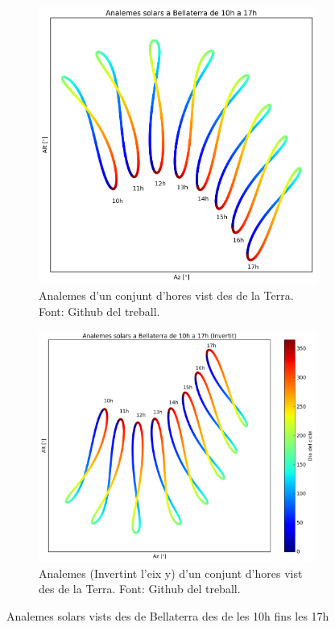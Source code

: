 \documentclass[a4paper, 11pt]{article}
\begin{document}
\begin{figure}[h!]
    \centering
    \begin{subfigure}{0.42\textwidth}
        \centering
        \includegraphics[width=\textwidth]{images/analema_simUAB.png}
        \caption{Analemes d'un conjunt d'hores vist des de la Terra. Font: Github del treball.}
        \label{subfig:analema_simUAB}
    \end{subfigure}
    \hspace{0.05\textwidth}
    \begin{subfigure}{0.48\textwidth}
        \centering
        \includegraphics[width=\textwidth]{images/analema_simUAB_invert.png}
        \caption{Analemes (Invertint l'eix y) d'un conjunt d'hores vist des de la Terra. Font: Github del treball.}
        \label{subfig:analema_simUAB_invert}
    \end{subfigure}
\caption{Analemes solars vists des de Bellaterra des de les 10h fins les 17h}
\end{figure}
\vspace{2mm}
\end{document}
